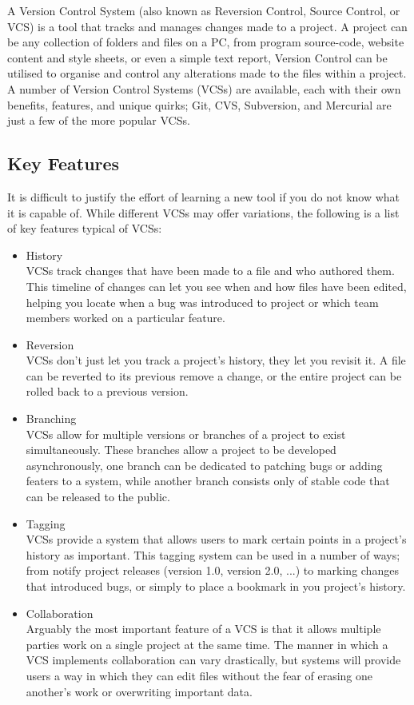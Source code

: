 \documentclass[11pt, a4paper, draft, titlepage]{article}
\begin{document}
A Version Control System (also known as Reversion Control, Source Control, or
VCS) is a tool that tracks and manages changes made to a project.  
A project can be any collection of folders and files on a PC, from program
source-code, website content and style sheets, or even a simple text report,
Version Control can be utilised to organise and control any alterations made
to the files within a project. 
A number of Version Control Systems (VCSs) are available, each with their own
benefits, features, and unique quirks; Git, CVS, Subversion, and Mercurial are
just a few of the more popular VCSs.


\subsection{Key Features}
It is difficult to justify the effort of learning a new tool if you do not
know what it is capable of.
While different VCSs may offer variations, the following is a list of key
features typical of VCSs:
\begin{itemize}
\item History\\
VCSs track changes that have been made to a file and who authored them.
This timeline of changes can let you see when and how files have been edited,
helping you locate when a bug was introduced to project or which team members
worked on a particular feature.
\item Reversion\\
VCSs don't just let you track a project's history, they let you revisit it. 
A file can be reverted to its previous remove a change, or the entire project
can be rolled back to a previous version.
\item Branching\\
VCSs allow for multiple versions or branches of a project to exist
simultaneously. 
These branches allow a project to be developed asynchronously, one branch can
be dedicated to patching bugs or adding featers to a system, while another
branch consists only of stable code that can be released to the public.
\item Tagging\\
VCSs provide a system that allows users to mark certain points in a project's
history as important.
This tagging system can be used in a number of ways; from notify project
releases (version 1.0, version 2.0, ...) to marking changes that introduced
bugs, or simply to place a bookmark in you project's history.
\item Collaboration\\
Arguably the most important feature of a VCS is that it allows multiple
parties work on a single project at the same time.
The manner in which a VCS implements collaboration can vary drastically, but
systems will provide users a way in which they can edit files without the
fear of erasing one another's work or overwriting important data.
\end{itemize}
\end{document}
